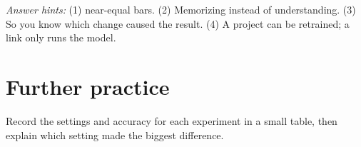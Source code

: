 \emph{Answer hints:} (1) near-equal bars. (2) Memorizing instead of understanding. (3) So you know which change caused the result. (4) A project can be retrained; a link only runs the model.


\section*{Further practice}

Record the settings and accuracy for each experiment in a small table, then explain which setting made the biggest difference.


\medskip\noindent\hrulefill\medskip

